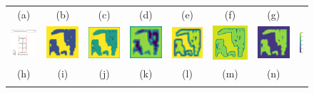 \documentclass[10pt,journal,compsoc]{IEEEtran}
\begin{document}
\begin{figure}[hbt]
\begin{tabular}{cccccccc}
		\scriptsize{(a)} & \scriptsize{(b)} & \scriptsize{(c)} &\scriptsize{(d)} & \scriptsize{(e)} & \scriptsize{(f)} & \scriptsize{(g)} & \\
		\includegraphics[width=.130\textwidth]{Ablation/mask-updating/edge18-0.png}  &
		\includegraphics[width=.130\textwidth]{Ablation/mask-updating/lbamforward1.png}  &
		\includegraphics[width=.130\textwidth]{Ablation/mask-updating/lbamforward2.png}  &
		\includegraphics[width=.130\textwidth]{Ablation/mask-updating/lbamforward3.png}  &
		\includegraphics[width=.130\textwidth]{Ablation/mask-updating/lbamreverse3.png}  &
		\includegraphics[width=.130\textwidth]{Ablation/mask-updating/lbamreverse2.png}  &
		\includegraphics[width=.130\textwidth]{Ablation/mask-updating/lbamreverse1.png} &
		\includegraphics[height=.130\textwidth]{paris/colorbar}\\
		\scriptsize{(h)} & \scriptsize{(i)} & \scriptsize{(j)} &\scriptsize{(k)} & \scriptsize{(l)} & \scriptsize{(m)} & \scriptsize{(n)} & \\
		\vspace{-2mm}
	\end{tabular}
	

\end{figure}
\end{document}
